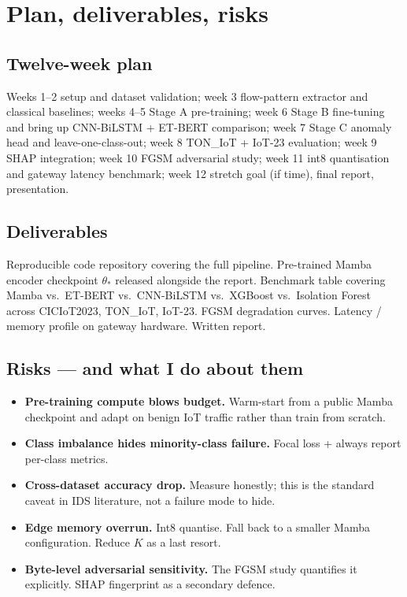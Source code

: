 \documentclass[11pt,a4paper]{article}
\begin{document}
\section{Plan, deliverables, risks}

\subsection{Twelve-week plan}
Weeks 1--2 setup and dataset validation; week 3 flow-pattern extractor and classical baselines; weeks 4--5 Stage A pre-training; week 6 Stage B fine-tuning and bring up CNN-BiLSTM + ET-BERT comparison; week 7 Stage C anomaly head and leave-one-class-out; week 8 TON\_IoT + IoT-23 evaluation; week 9 SHAP integration; week 10 FGSM adversarial study; week 11 int8 quantisation and gateway latency benchmark; week 12 stretch goal (if time), final report, presentation.

\subsection{Deliverables}
Reproducible code repository covering the full pipeline. Pre-trained Mamba encoder checkpoint $\theta_*$ released alongside the report. Benchmark table covering Mamba vs.\ ET-BERT vs.\ CNN-BiLSTM vs.\ XGBoost vs.\ Isolation Forest across CICIoT2023, TON\_IoT, IoT-23. FGSM degradation curves. Latency / memory profile on gateway hardware. Written report.

\subsection{Risks --- and what I do about them}
\begin{tcolorbox}[warnbox]
\begin{itemize}[leftmargin=*, itemsep=1pt, topsep=0pt]
  \item \textbf{Pre-training compute blows budget.} Warm-start from a public Mamba checkpoint and adapt on benign IoT traffic rather than train from scratch.
  \item \textbf{Class imbalance hides minority-class failure.} Focal loss + always report per-class metrics.
  \item \textbf{Cross-dataset accuracy drop.} Measure honestly; this is the standard caveat in IDS literature, not a failure mode to hide.
  \item \textbf{Edge memory overrun.} Int8 quantise. Fall back to a smaller Mamba configuration. Reduce $K$ as a last resort.
  \item \textbf{Byte-level adversarial sensitivity.} The FGSM study quantifies it explicitly. SHAP fingerprint as a secondary defence.
\end{itemize}
\end{tcolorbox}
\end{document}
